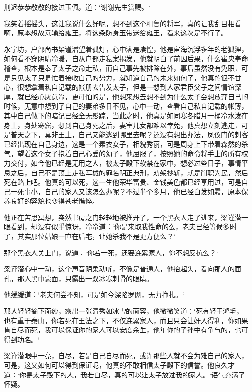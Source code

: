 荆迟恭恭敬敬的接过玉佩，道：‘谢谢先生赏赐。‘

我笑着摇摇头，这让我说什么好呢，想不到这个粗鲁的将军，真的让我刮目相看啊，原本想故意输给雍王，将这条防身玉带送给雍王，看来这次是不行了。

永宁坊，户部尚书梁谨潜望着孤灯，心中满是凄惶，他是宦海沉浮多年的老狐狸，如何看不穿阴晴冷暖，自从户部走私案揭发，他就明白了前因后果，什么崔央奉命稽查，根本是奉了太子之命走私，而自己事先被排除在外，事后虽然没有免职，可是只见太子只是忙着接收自己的势力，就知道自己的未来如何了，他真的很不甘心，很想拿着私自记载的帐册去告发太子，但是一想到人家君臣父子之间情谊深厚，就已经心灰意冷，更可怕的是，他想来想去想不到为什么太子会想放弃自己的时候，无意中想到了自己的妻弟多日不见，心中一动，查看自己私自记载的帐薄，其中自己做下的暗记已经全无影踪，当此之时，他真是如同寒冬腊月一桶冷水泼在身上，身处寒窟，想到自己身死之后，妻室儿女都难以幸免，他真想立刻逃走，可是普天之下，莫非王土，自己又能逃到哪里去呢？还没有想出办法，凤仪门的刺客已经出现在自己身边，这是一个素衣女子，相貌秀丽，可是周身上下带着森然的杀气，望着这个女子抱着自己心爱的幼子，他屈服了，按照她的命令将手上的所有权力交付，如今他已经是无用之人，被太子殿下软禁在家中，想必过些日子，事情平息之后，自己不是顶上走私军械的罪名明正典刑，劝架抄斩，就是削职为民，然后死在路上吧。他真的可以死，这一生他荣华富贵、金钱美色都已经享用过，可是自己一死事小，自己的家人又该怎么办呢？不过半个多月，他已经白发如霜，原本保养良好的容貌也变得苍老憔悴。

他正在苦思冥想，突然书房之门轻轻地被推开了，一个黑衣人走了进来，梁谨潜一眼看到，却没有似乎惊讶，冷冷道：‘你是来取我性命的么，老夫已经等候多时了，其实那位姑娘一直在后宅，让她杀我不是更方便么？‘

那个黑衣人关上门，说道：‘你若一死，还要连累家人，你不想反抗么？‘

梁谨潜心中一动，这个声音阴柔动听，不像是普通人，他抬起头，看向那人的面孔，那人黑巾蒙面，只露出一双冰寒刺骨的眼睛。

他缓缓道：‘老夫何尝不知，可是如今深陷罗网，无力挣扎。‘

那人轻轻摘下面纱，露出一张清秀如冰雪的面容，他微微笑道：‘死有轻于鸿毛，也有重于泰山，你若死在王法之下，不仅连累家人，而且只会让奸人得利，你如果肯自尽而死，我可以保证你的家人可以安度余生，他年你的子孙中有争气的，也可得到功名。‘

梁谨潜眼中一亮，自尽，若是自己自尽而死，或许那些人就不会为难自己的家人，可是，这又如何可以得到保证呢，他真的不敢相信太子殿下的信誉。他良久才道：‘你是太子殿下的人，我若自尽，真的可以让太子放过我的家人。‘语气充满了怀疑。

